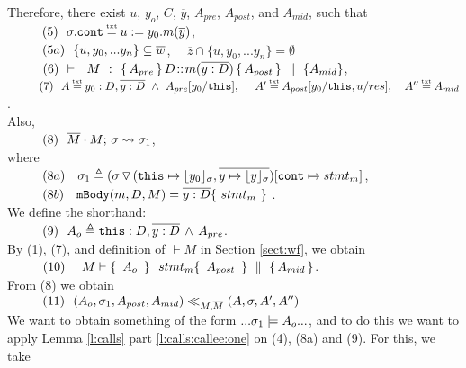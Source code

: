 \begin{description}
 Therefore, there exist $u$, $y_o$, $C$, $\overline y$,  $A_{pre}$, $A_{post}$, and $A_{mid}$, such that \\
 $\SPS (5) \ \ \sigma.\prg{cont}\txteq u:=y_0.m(\overline y)$,\\
$\strut \ \ \hspace{0.5cm} \ \  (5a) \ \ \{ u, y_0, ... y_n \}  \subseteq \overline w $, \ \ $\overline z \cap  \{ u, y_0, ... y_n \}  = \emptyset$ \\ 
$\strut \ \ \hspace{0.5cm} \ \  (6) \  \ {\vdash \ \ M\ \ \mathbf{:}\ \  \{\, A_{pre}\, \}\, D\!::\!m(\overline{y:D})\, \{\, A_{post}\, \} \, \,\parallel\,\, \{ A_{mid} \}}$, \\
$\SPS (7) \  \ A \txteq y_0:D ,\overline {y:D}\ \wedge \  A_{pre}[y_0/\prg{this}],\ \  \ \ 
A'  \txteq A_{post}[y_0/\prg{this},u/res],\ \ \ 
A'' \txteq  A_{mid}$. 
\\
Also, \\
$\strut \ \ \hspace{0.5cm} \ \  (8) \ \ \overline{M}\cdot M;\, {\sigma} \rightsquigarrow \sigma_1$, \\
 where \\
$\strut \ \ \hspace{0.5cm} \ \  (8a) \ \ \ \sigma_1\triangleq ( \sigma \, {\triangledown}\,  (\mbox{\normalfont{\texttt{this}}}\mapsto {\lfloor y_0 \rfloor_{\sigma}},{\overline{y \mapsto {\lfloor y \rfloor_{\sigma}}}}) [\mbox{\normalfont{\texttt{cont}}}\mapsto stmt_m]$, \\%
$\strut \ \ \hspace{0.5cm} \ \  (8b) \ \ \   \mbox{\normalfont{\texttt{mBody}}}(m,D,M)=\overline{y:D}\{\    stmt_m\ \}$ .\\
We define the shorthand:\\
$\strut \ \ \hspace{0.5cm} \ \  (9) \ \  A_{o} \triangleq  \mbox{\normalfont{\texttt{this}}}:D,\overline{y:D}\, \wedge\, A_{pre}$.
\\
By (1), (7), and definition of $\vdash M$ in Section \ref{sect:wf}, we obtain\\
$\strut \ \ \hspace{0.5cm} \ \  (10) \ \ \ \ M \vdash   \{\,  \ A_{o} \   \, \}\ \ stmt_m  \{\, \ A_{post}\  \, \} \, \,\parallel\,\, \{\, A_{mid} \, \} $.\\
From (8) we obtain\\ %
$\strut \ \ \hspace{0.5cm} \ \  (11) \ \ (A_{o},\sigma_1,A_{post}, A_{mid}) \ll_{M,\overline{M}} (A,\sigma,A', A'')$
\\
We want to obtain something of the form $... \sigma_1 \models A_{o} ...$, and to do this we want to apply Lemma   \ref{l:calls} part \ref{l:calls:callee:one} on (4), (8a) and (9). For this, we take

\end{description}
